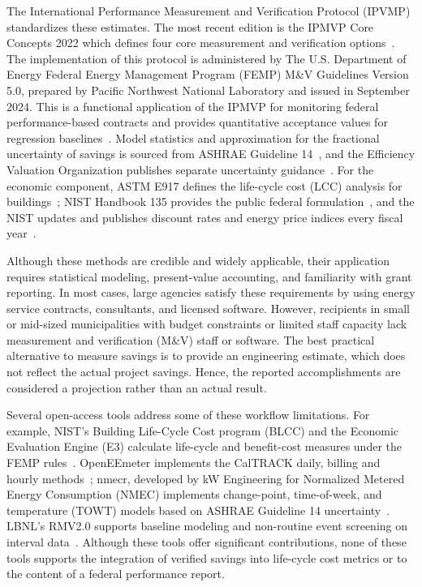 \documentclass[10pt,twocolumn,letterpaper]{article}
\begin{document}
The International Performance Measurement and Verification Protocol (IPVMP) standardizes these estimates. The most recent edition is the IPMVP Core Concepts 2022 which defines four core measurement and verification options~\cite{evo_ipmvp}. The implementation of this protocol is administered by The U.S. Department of Energy Federal Energy Management Program (FEMP) M\&V Guidelines Version 5.0, prepared by Pacific Northwest National Laboratory and issued in September 2024. This is a functional application of the IPMVP for monitoring federal performance-based contracts and provides quantitative acceptance values for regression baselines~\cite{femp2024}. Model statistics and approximation for the fractional uncertainty of savings is sourced from ASHRAE Guideline 14~\cite{ashrae14}, and the Efficiency Valuation Organization publishes separate uncertainty guidance~\cite{evo_uncertainty}. For the economic component, ASTM E917 defines the life-cycle cost (LCC) analysis for buildings~\cite{astm_e917}; NIST Handbook 135 provides the public federal formulation~\cite{fuller1996}, and the NIST updates and publishes discount rates and energy price indices every fiscal year~\cite{nist2025}.

Although these methods are credible and widely applicable, their application requires statistical modeling, present-value accounting, and familiarity with grant reporting. In most cases, large agencies satisfy these requirements by using energy service contracts, consultants, and licensed software. However, recipients in small or mid-sized municipalities with budget constraints or limited staff capacity lack measurement and verification (M\&V) staff or software. The best practical alternative to measure savings is to provide an engineering estimate, which does not reflect the actual project savings. Hence, the reported accomplishments are considered a projection rather than an actual result.

Several open-access tools address some of these workflow limitations. For example, NIST's Building Life-Cycle Cost program (BLCC) and the Economic Evaluation Engine (E3) calculate life-cycle and benefit-cost measures under the FEMP rules~\cite{blcc,e3}. OpenEEmeter implements the CalTRACK daily, billing and hourly methods~\cite{eemeter}; nmecr, developed by kW Engineering for Normalized Metered Energy Consumption (NMEC) implements change-point, time-of-week, and temperature (TOWT) models based on ASHRAE Guideline 14 uncertainty~\cite{nmecr}. LBNL's RMV2.0 supports baseline modeling and non-routine event screening on interval data~\cite{rmv2}. Although these tools offer significant contributions, none of these tools supports the integration of verified savings into life-cycle cost metrics or to the content of a federal performance report.
\end{document}
